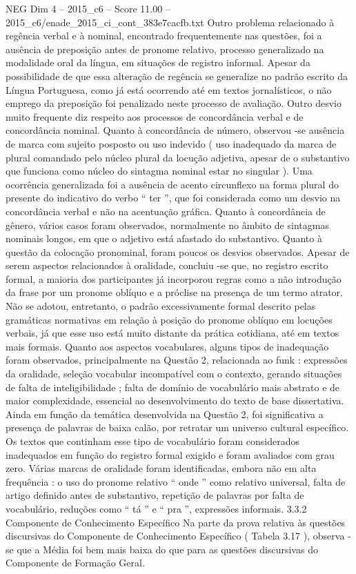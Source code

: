 \begin{textsample}{NEG Dim 4 – 2015\_c6 – Score 11.00 – 2015\_c6/enade\_2015\_ci\_cont\_383e7cacfb.txt}
Outro problema relacionado à regência verbal e à nominal, encontrado frequentemente nas questões, foi a ausência de preposição antes de pronome relativo, processo generalizado na modalidade oral da língua, em situações de registro informal.
Apesar da possibilidade de que essa alteração de regência se generalize no padrão escrito da Língua Portuguesa, como já está ocorrendo até em textos jornalísticos, o não emprego da preposição foi penalizado neste processo de avaliação.
Outro desvio muito frequente diz respeito aos processos de concordância verbal e de concordância nominal.
Quanto à concordância de número, observou -se ausência de marca com sujeito posposto ou uso indevido ( uso inadequado da marca de plural comandado pelo núcleo plural da locução adjetiva, apesar de o substantivo que funciona como núcleo do sintagma nominal estar no singular ).
Uma ocorrência generalizada foi a ausência de acento circunflexo na forma plural do presente do indicativo do verbo “ ter ”, que foi considerada como um desvio na concordância verbal e não na acentuação gráfica.
Quanto à concordância de gênero, vários casos foram observados, normalmente no âmbito de sintagmas nominais longos, em que o adjetivo está afastado do substantivo.
Quanto à questão da colocação pronominal, foram poucos os desvios observados.
Apesar de serem aspectos relacionados à oralidade, concluiu -se que, no registro escrito formal, a maioria dos participantes já incorporou regras como a não introdução da frase por um pronome oblíquo e a próclise na presença de um termo atrator.
Não se adotou, entretanto, o padrão excessivamente formal descrito pelas gramáticas normativas em relação à posição do pronome oblíquo em locuções verbais, já que esse uso está muito distante da prática cotidiana, até em textos mais formais.
Quanto aos aspectos vocabulares, alguns tipos de inadequação foram observados, principalmente na Questão 2, relacionada ao funk : expressões da oralidade, seleção vocabular incompatível com o contexto, gerando situações de falta de inteligibilidade ; falta de domínio de vocabulário mais abstrato e de maior complexidade, essencial ao desenvolvimento do texto de base dissertativa.
Ainda em função da temática desenvolvida na Questão 2, foi significativa a presença de palavras de baixa calão, por retratar um universo cultural específico.
Os textos que continham esse tipo de vocabulário foram considerados inadequados em função do registro formal exigido e foram avaliados com grau zero.
Várias marcas de oralidade foram identificadas, embora não em alta frequência : o uso do pronome relativo “ onde ” como relativo universal, falta de artigo definido antes de substantivo, repetição de palavras por falta de vocabulário, reduções como “ tá ” e “ pra ”, expressões informais. 3.3.2 Componente de Conhecimento Específico Na parte da prova relativa às questões discursivas do Componente de Conhecimento Específico ( Tabela 3.17 ), observa -se que a Média foi bem mais baixa do que para as questões discursivas do Componente de Formação Geral.

\end{textsample}
